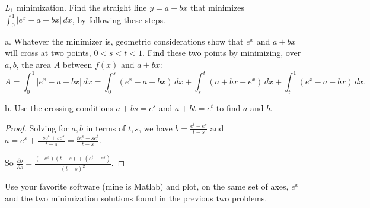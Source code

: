 \documentclass{article}
\begin{document}
 $L_1$ minimization. Find the straight line $y = a + bx$ that minimizes  $\int_0^1|e^x − a − bx| \, dx$, by following these steps.

a. Whatever the minimizer is, geometric considerations show that $e^x$ and $a+bx$ will cross at two points, $0 < s < t < 1$. Find these two points by minimizing, over $a,b$, the area $A$ between $f(x)$ and $a+bx$:
$$A=\int_0^1 |e^x − a −bx| \, dx = \int_0^s (e^x − a −bx)\,dx + \int_s^t (a+bx−e^x) \,dx +  \int_t^1(e^x − a − bx) \,dx.$$

b. Use the crossing conditions $a + bs = e^s$ and $a + bt = e^t$ to find $a$ and $b$.

\begin{proof}

Solving for $a,b$ in terms of $t, s$, we have
$b = \frac {e^t - e^s} { t-s}$ and $ a = e^s + \frac {- s e^t + s e^s} { t-s}  = \frac {t e^s - s e^t} {t - s}$.

So $\frac {\partial b} {\partial s} = \frac{(-e^s)(t-s) + (e^t - e^s)}{(t-s)^2}$.




\end{proof}

 Use your favorite software (mine is Matlab) and plot, on the same set of axes, $e^x$ and the two minimization solutions found in the previous two problems.
\end{document}
